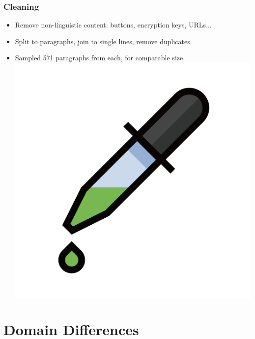\documentclass[t,xcolor={svgnames,table}]{beamer}
\begin{document}
\begin{frame}[fragile]
	\frametitle{Cleaning}
	\begin{itemize}\setlength\itemsep{1em}
	\item Remove non-linguistic content: buttons, encryption keys, URLs...
	\item Split to paragraphs, join to single lines, remove duplicates.
	\item Sampled 571 paragraphs from each, for comparable size.
	\includegraphics[width=.2\textwidth]{pipette.png}

	\end{itemize}
\end{frame}

\section{Domain Differences}
\end{document}
